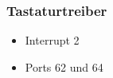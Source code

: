 \subsubsection{Tastaturtreiber}



\begin{itemize}
	\item Interrupt 2
	\item Ports 62 und 64
\end{itemize}